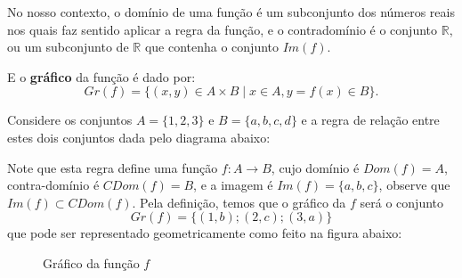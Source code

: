No nosso contexto, o domínio de uma função é um subconjunto dos números reais nos quais faz sentido aplicar a regra da função, e o contradomínio é o conjunto $\mathbb{R}$, ou um subconjunto de $\mathbb{R}$ que contenha o conjunto $Im(f)$.

E o \textbf{gráfico} da função é dado por:
\begin{equation}
Gr(f) = \{ (x, y) \in A \times B \mid x \in A, y = f(x) \in B\} .
\end{equation}

\begin{exem}
 Considere os conjuntos $A= \{1, 2, 3\}$ e $B= \{a, b, c, d\}$ e a regra de relação entre estes dois conjuntos dada pelo diagrama abaixo:

 \begin{figure}[H]
 \centering
\end{figure}

Note que esta regra define uma função $f: A \rightarrow B$, cujo domínio é $Dom(f) = A$, contra-domínio é $CDom(f) = B$, e a imagem é $Im(f)= \{a, b, c\}$, observe que $Im(f) \subset CDom(f)$. Pela definição, temos que o gráfico da $f$ será o conjunto
\[
Gr(f)= \{(1, b); (2, c); (3, a)\}
\]
que pode ser representado geometricamente como feito na figura abaixo:

\begin{figure}[H]
 \centering
    \caption{Gráfico da função $f$}
  \end{figure}

\end{exem}

